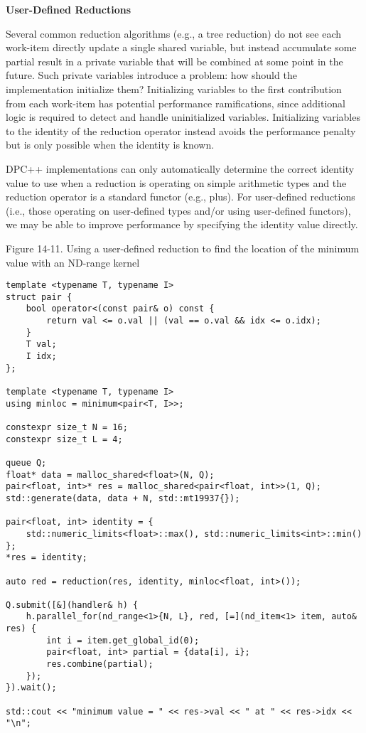 \hspace*{\fill} \par %
\textbf{User-Defined Reductions}

Several common reduction algorithms (e.g., a tree reduction) do not see each work-item directly update a single shared variable, but instead accumulate some partial result in a private variable that will be combined at some point in the future. Such private variables introduce a problem: how should the implementation initialize them? Initializing variables to the first contribution from each work-item has potential performance ramifications, since additional logic is required to detect and handle uninitialized variables. Initializing variables to the identity of the reduction operator instead avoids the performance penalty but is only possible when the identity is known.\par

DPC++ implementations can only automatically determine the correct identity value to use when a reduction is operating on simple arithmetic types and the reduction operator is a standard functor (e.g., plus). For user-defined reductions (i.e., those operating on user-defined types and/or using user-defined functors), we may be able to improve performance by specifying the identity value directly.\par

\hspace*{\fill} \par %
Figure 14-11. Using a user-defined reduction to find the location of the minimum value with an ND-range kernel
\begin{lstlisting}[caption={}]
template <typename T, typename I>
struct pair {
	bool operator<(const pair& o) const {
		return val <= o.val || (val == o.val && idx <= o.idx);
	}
	T val;
	I idx;
};

template <typename T, typename I>
using minloc = minimum<pair<T, I>>;

constexpr size_t N = 16;
constexpr size_t L = 4;

queue Q;
float* data = malloc_shared<float>(N, Q);
pair<float, int>* res = malloc_shared<pair<float, int>>(1, Q);
std::generate(data, data + N, std::mt19937{});

pair<float, int> identity = {
	std::numeric_limits<float>::max(), std::numeric_limits<int>::min()
};
*res = identity;

auto red = reduction(res, identity, minloc<float, int>());

Q.submit([&](handler& h) {
	h.parallel_for(nd_range<1>{N, L}, red, [=](nd_item<1> item, auto& res) {
		int i = item.get_global_id(0);
		pair<float, int> partial = {data[i], i};
		res.combine(partial);
	});
}).wait();

std::cout << "minimum value = " << res->val << " at " << res->idx << "\n";
\end{lstlisting}

